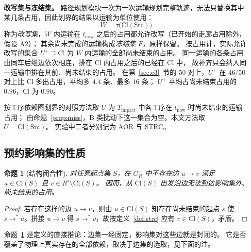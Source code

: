 \documentclass[manuscript,screen,review]{acmart}
\providecommand{\STRC}{\textsc{STRC}}
\newcommand{\NPairs}{50}
\newcommand{\ClosureAliveFrac}{90\%}
\newcommand{\ClosureShareMean}{0.90} %
\newcommand{\SegExtraPairs}{46/\NPairs}  %
\newcommand{\SegExtraMean}{4.4}          %
\newcommand{\SegExtraMax}{16}            %
\newcommand{\SegShare}{0.96}             %
\newtheorem{prop}{命题}
\begin{document}
\textbf{改写集与冻结集。}
路径规划模块一次为一次运输规划完整轨迹，无法只替换其中某几条占用，因此划界的结果以运输为单位使用：
\[
W=\tau\bigl(\mathrm{Cl}(\mathrm{Src})\bigr)
\]
称为\emph{改写集}，\(W\) 内运输在 \(t_{\mathrm{now}}\) 之后的占用都允许改写（已开始的走廊占用除外，假设 A2）；
其余尚未完成的运输构成\emph{冻结集} \(F\)，原样保留。
按占用计，实际允许改写的集合 \(U^{+}\supseteq\mathrm{Cl}\) 为 \(W\) 内运输的全部尚未结束的占用。
同一运输的各条占用由同车后继边依次相连，排在 \(\mathrm{Cl}\) 内占用之后的已经在 \(\mathrm{Cl}\) 中，
故补齐只会纳入同一运输中排在其前、尚未结束的占用。
在第~\ref{sec:e3}~节的 \(\NPairs\) 对上，\(U^{+}\) 在 \(\SegExtraPairs\) 对上比 \(\mathrm{Cl}\) 多出占用，平均多 \(\SegExtraMean\) 条、最多 \(\SegExtraMax\) 条；
\(U^{+}\) 平均占尚未结束占用的 \(\SegShare\)，\(\mathrm{Cl}\) 为 \(\ClosureShareMean\)。

按工序依赖图划界的对照方法取 \(U\) 为 \(T_{\mathrm{impact}}\) 中各工序在 \(t_{\mathrm{now}}\) 时尚未结束的运输占用；
由命题~\ref{prop:miss}，B 类扰动下这一集合为空。本文方法取 \(U=\mathrm{Cl}(\mathrm{Src})\)。
实验中二者分别记为 AOR 与 \STRC{}。

\subsection{预约影响集的性质}
\label{sec:containment}

\begin{prop}[结构闭合性]
\label{prop:struct}
对任意起点集 \(S\)，在 \(G_R^\circ\) 中不存在边
\(u\to v\) 满足 \(u\in\mathrm{Cl}(S)\) 且 \(v\in R^{\circ}\setminus\mathrm{Cl}(S)\)。
因而，从 \(\mathrm{Cl}(S)\) 出发沿边无法到达影响集外、尚未结束的占用。
\end{prop}

\begin{proof}
若存在这样的边 \(u\to v\)，则由 \(u\in\mathrm{Cl}(S)\) 知存在尚未结束的起点 \(s\) 使
\(s\to^* u\)。拼接 \(u\to v\) 得 \(s\to^* v\)，故按定义~\ref{def:strc} 应有
\(v\in\mathrm{Cl}(S)\)，矛盾。
\end{proof}

命题~\ref{prop:struct} 是定义的直接推论：边集一经固定，影响集对这些边就是封闭的。
它是否覆盖了物理上真实存在的全部依赖，取决于边集的选取，见下面的注。
\end{document}
